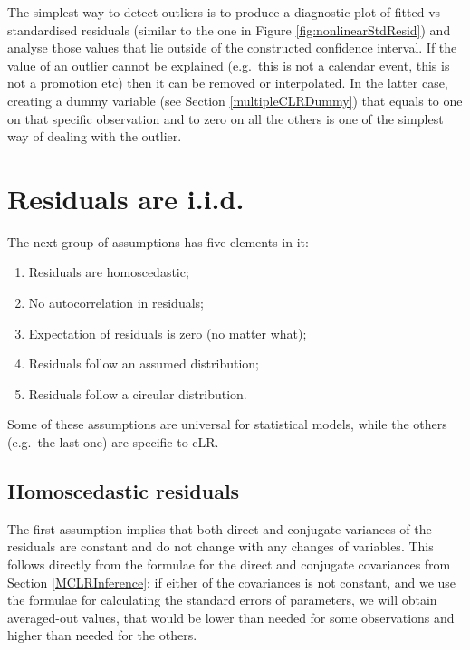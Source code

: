 \documentclass[
]{book}
\providecommand{\tightlist}{%
  \setlength{\itemsep}{0pt}\setlength{\parskip}{0pt}}
\begin{document}
The simplest way to detect outliers is to produce a diagnostic plot of fitted vs standardised residuals (similar to the one in Figure \ref{fig:nonlinearStdResid}) and analyse those values that lie outside of the constructed confidence interval. If the value of an outlier cannot be explained (e.g.~this is not a calendar event, this is not a promotion etc) then it can be removed or interpolated. In the latter case, creating a dummy variable (see Section \ref{multipleCLRDummy}) that equals to one on that specific observation and to zero on all the others is one of the simplest way of dealing with the outlier.

\hypertarget{assumptionsResiduals}{%
\section{Residuals are i.i.d.}\label{assumptionsResiduals}}

The next group of assumptions has five elements in it:

\begin{enumerate}
\def\labelenumi{\arabic{enumi}.}
\tightlist
\item
  Residuals are homoscedastic;
\item
  No autocorrelation in residuals;
\item
  Expectation of residuals is zero (no matter what);
\item
  Residuals follow an assumed distribution;
\item
  Residuals follow a circular distribution.
\end{enumerate}

Some of these assumptions are universal for statistical models, while the others (e.g.~the last one) are specific to cLR.

\hypertarget{assumptionsResidualsHomoscedastic}{%
\subsection{Homoscedastic residuals}\label{assumptionsResidualsHomoscedastic}}

The first assumption implies that both direct and conjugate variances of the residuals are constant and do not change with any changes of variables. This follows directly from the formulae for the direct and conjugate covariances from Section \ref{MCLRInference}: if either of the covariances is not constant, and we use the formulae for calculating the standard errors of parameters, we will obtain averaged-out values, that would be lower than needed for some observations and higher than needed for the others.
\end{document}
